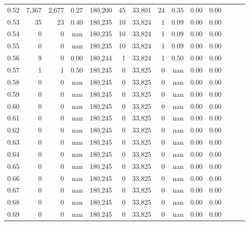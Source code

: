 \begin{tabular}{rrrrrrrrrrrrrr}
0.52 &    7,367 &   2,677 &  0.27 &  180,200 &       45 &  33,801 &      24 &  0.35 &  0.00 &      0.00 \\
0.53 &       35 &      23 &  0.40 &  180,235 &       10 &  33,824 &       1 &  0.09 &  0.00 &      0.00 \\
0.54 &        0 &       0 &   nan &  180,235 &       10 &  33,824 &       1 &  0.09 &  0.00 &      0.00 \\
0.55 &        0 &       0 &   nan &  180,235 &       10 &  33,824 &       1 &  0.09 &  0.00 &      0.00 \\
0.56 &        9 &       0 &  0.00 &  180,244 &        1 &  33,824 &       1 &  0.50 &  0.00 &      0.00 \\
0.57 &        1 &       1 &  0.50 &  180,245 &        0 &  33,825 &       0 &   nan &  0.00 &      0.00 \\
0.58 &        0 &       0 &   nan &  180,245 &        0 &  33,825 &       0 &   nan &  0.00 &      0.00 \\
0.59 &        0 &       0 &   nan &  180,245 &        0 &  33,825 &       0 &   nan &  0.00 &      0.00 \\
0.60 &        0 &       0 &   nan &  180,245 &        0 &  33,825 &       0 &   nan &  0.00 &      0.00 \\
0.61 &        0 &       0 &   nan &  180,245 &        0 &  33,825 &       0 &   nan &  0.00 &      0.00 \\
0.62 &        0 &       0 &   nan &  180,245 &        0 &  33,825 &       0 &   nan &  0.00 &      0.00 \\
0.63 &        0 &       0 &   nan &  180,245 &        0 &  33,825 &       0 &   nan &  0.00 &      0.00 \\
0.64 &        0 &       0 &   nan &  180,245 &        0 &  33,825 &       0 &   nan &  0.00 &      0.00 \\
0.65 &        0 &       0 &   nan &  180,245 &        0 &  33,825 &       0 &   nan &  0.00 &      0.00 \\
0.66 &        0 &       0 &   nan &  180,245 &        0 &  33,825 &       0 &   nan &  0.00 &      0.00 \\
0.67 &        0 &       0 &   nan &  180,245 &        0 &  33,825 &       0 &   nan &  0.00 &      0.00 \\
0.68 &        0 &       0 &   nan &  180,245 &        0 &  33,825 &       0 &   nan &  0.00 &      0.00 \\
0.69 &        0 &       0 &   nan &  180,245 &        0 &  33,825 &       0 &   nan &  0.00 &      0.00 \\

\end{tabular}
